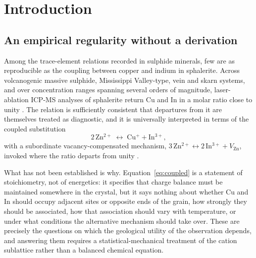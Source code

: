 \documentclass[11pt,a4paper]{article}
\begin{document}
\begin{abstract}
\vspace{4pt}
\noindent\textit{Keywords:} sphalerite; indium; coupled substitution; charge
compensation; statistical thermodynamics; Monte Carlo; roquesite; critical
metals
\end{abstract}

\section{Introduction}

\subsection{An empirical regularity without a derivation}

Among the trace-element relations recorded in sulphide minerals, few are as
reproducible as the coupling between copper and indium in sphalerite. Across
volcanogenic massive sulphide, Mississippi Valley-type, vein and skarn systems,
and over concentration ranges spanning several orders of magnitude,
laser-ablation ICP-MS analyses of sphalerite return Cu and In in a molar ratio
close to unity \citep{cook2009,frenzel2016}. The relation is sufficiently
consistent that
departures from it are themselves treated as diagnostic, and it is universally
interpreted in terms of the coupled substitution
\begin{equation}
2\,\mathrm{Zn^{2+}} \;\longleftrightarrow\; \mathrm{Cu^{+}} + \mathrm{In^{3+}},
\label{eq:coupled}
\end{equation}
with a subordinate vacancy-compensated mechanism,
$3\,\mathrm{Zn^{2+}} \leftrightarrow 2\,\mathrm{In^{3+}} + V_{\mathrm{Zn}}$,
invoked where the ratio departs from unity
\citep{johan1988,belissont2014}.

What has not been established is why. Equation~\eqref{eq:coupled} is a statement
of stoichiometry, not of energetics: it specifies that charge balance must be
maintained somewhere in the crystal, but it says nothing about whether Cu and In
should occupy adjacent sites or opposite ends of the grain, how strongly they
should be associated, how that association should vary with temperature, or
under what conditions the alternative mechanism should take over. These are
precisely the questions on which the geological utility of the observation
depends, and answering them requires a statistical-mechanical treatment of the
cation sublattice rather than a balanced chemical equation.
\end{document}
